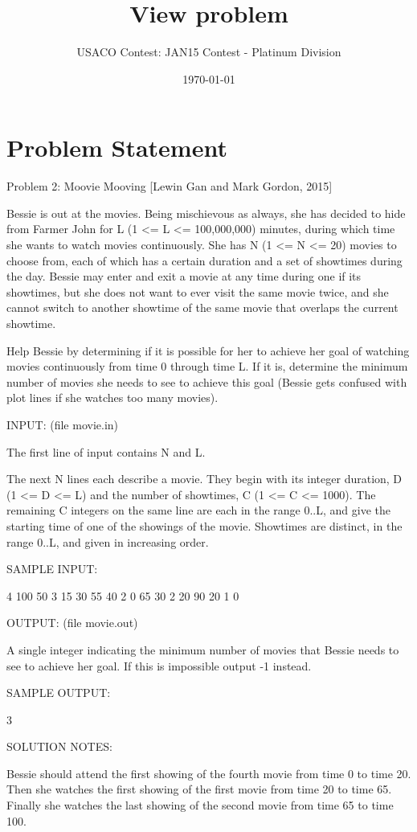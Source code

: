 \documentclass[12pt]{article}
\title{View problem}
\author{USACO Contest: JAN15 Contest - Platinum Division}
\date{\today}
\begin{document}
\maketitle

\section*{Problem Statement}

Problem 2: Moovie Mooving [Lewin Gan and Mark Gordon, 2015]

Bessie is out at the movies.  Being mischievous as always, she has
decided to hide from Farmer John for L (1 <= L <= 100,000,000)
minutes, during which time she wants to watch movies continuously.
She has N (1 <= N <= 20) movies to choose from, each of which has a
certain duration and a set of showtimes during the day.  Bessie may
enter and exit a movie at any time during one if its showtimes, but
she does not want to ever visit the same movie twice, and she cannot
switch to another showtime of the same movie that overlaps the
current showtime.

Help Bessie by determining if it is possible for her to achieve her
goal of watching movies continuously from time 0 through time L.  If
it is, determine the minimum number of movies she needs to see to
achieve this goal (Bessie gets confused with plot lines if she watches
too many movies).

INPUT: (file movie.in)

The first line of input contains N and L.

The next N lines each describe a movie.  They begin with its integer
duration, D (1 <= D <= L) and the number of showtimes, C (1 <= C <=
1000).  The remaining C integers on the same line are each in the
range 0..L, and give the starting time of one of the showings of the
movie.  Showtimes are distinct, in the range 0..L, and given in
increasing order.

SAMPLE INPUT:

4 100
50 3 15 30 55
40 2 0 65
30 2 20 90
20 1 0

OUTPUT: (file movie.out)

A single integer indicating the minimum number of movies that Bessie
needs to see to achieve her goal.  If this is impossible output -1
instead.

SAMPLE OUTPUT:

3

SOLUTION NOTES:

Bessie should attend the first showing of the fourth movie from time 0
to time 20.  Then she watches the first showing of the first movie
from time 20 to time 65.  Finally she watches the last showing of the
second movie from time 65 to time 100.
\end{document}
